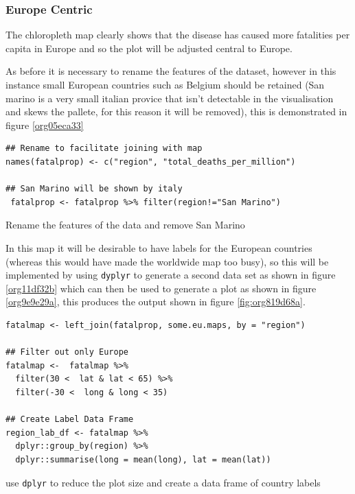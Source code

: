 \documentclass[11pt]{article}
\begin{document}
\subsubsection{Europe Centric}
\label{sec:org02053d1}
The chloropleth map clearly shows that the disease has caused more fatalities
per capita in Europe and so the plot will be adjusted central to Europe.

As before it is necessary to rename the features of the dataset, however in this
instance small European countries such as Belgium should be retained (San marino
is a very small italian provice that isn't detectable in the visualisation and
skews the pallete, for this reason it will be removed), this is demonstrated in
figure \ref{org05eca33}

\begin{listing}[htbp]
\begin{verbatim}
## Rename to facilitate joining with map
names(fatalprop) <- c("region", "total_deaths_per_million")

## San Marino will be shown by italy
 fatalprop <- fatalprop %>% filter(region!="San Marino")
\end{verbatim}
\caption{\label{org05eca33}Rename the features of the data and remove San Marino}
\end{listing}

In this map it will be desirable to have labels for the European countries
(whereas this would have made the worldwide map too busy), so this will be
implemented by using \texttt{dyplyr} to generate a second data set as shown in figure
\ref{org11df32b} which can then be used to generate a plot as shown in figure \ref{org9e9e29a}, this
produces the output shown in figure \ref{fig:org819d68a}.

\begin{listing}[htbp]
\begin{verbatim}
fatalmap <- left_join(fatalprop, some.eu.maps, by = "region")

## Filter out only Europe
fatalmap <-  fatalmap %>%
  filter(30 <  lat & lat < 65) %>%
  filter(-30 <  long & long < 35)

## Create Label Data Frame
region_lab_df <- fatalmap %>%
  dplyr::group_by(region) %>%
  dplyr::summarise(long = mean(long), lat = mean(lat))
\end{verbatim}
\caption{\label{org11df32b}use \texttt{dplyr} to reduce the plot size and create a data frame of country labels}
\end{listing}
\end{document}
